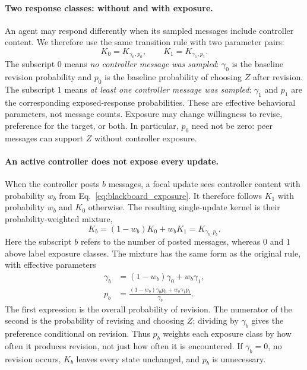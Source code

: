 \paragraph{Two response classes: without and with exposure.}
An agent may respond differently when its sampled messages include
controller content. We therefore use the same transition rule with two
parameter pairs:
\[
K_0=K_{\gamma_0,p_0},\qquad K_1=K_{\gamma_1,p_1}.
\]
The subscript $0$ means \emph{no controller message was sampled}:
$\gamma_0$ is the baseline revision probability and $p_0$ is the baseline
probability of choosing $Z$ after revision. The subscript $1$ means
\emph{at least one controller message was sampled}: $\gamma_1$ and $p_1$
are the corresponding exposed-response probabilities. These are effective
behavioral parameters, not message counts. Exposure may change willingness
to revise, preference for the target, or both. In particular, $p_0$ need
not be zero: peer messages can support $Z$ without controller exposure.

\paragraph{An active controller does not expose every update.}
When the controller posts $b$ messages, a focal update sees controller
content with probability $w_b$ from Eq.~\eqref{eq:blackboard_exposure}.
It therefore follows $K_1$ with probability $w_b$ and $K_0$ otherwise.
The resulting single-update kernel is their probability-weighted mixture,
\begin{equation}
K_b=(1-w_b)K_0+w_bK_1=K_{\gamma_b,p_b}.
\end{equation}
Here the subscript $b$ refers to the number of posted messages, whereas
$0$ and $1$ above label exposure classes. The mixture has the same form as
the original rule, with effective parameters
\begin{align}
\gamma_b&=(1-w_b)\gamma_0+w_b\gamma_1,\\
p_b&=\frac{(1-w_b)\gamma_0p_0+w_b\gamma_1p_1}{\gamma_b}.
\label{eq:blackboard_mixture}
\end{align}
The first expression is the overall probability of revision. The numerator
of the second is the probability of revising and choosing $Z$; dividing by
$\gamma_b$ gives the preference conditional on revision. Thus $p_b$ weights
each exposure class by how often it produces revision, not just how often
it is encountered. If $\gamma_b=0$, no revision occurs, $K_b$ leaves every
state unchanged, and $p_b$ is unnecessary.


